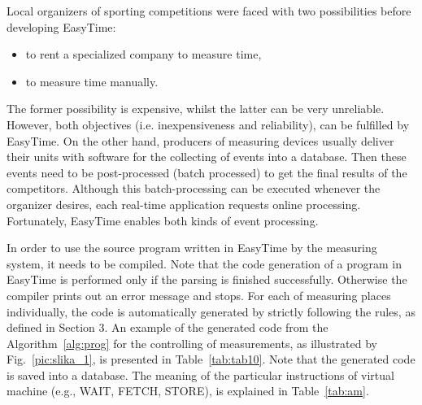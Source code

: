 \documentclass[preprint, prX]{revtex4}
\begin{document}
Local organizers of sporting competitions were faced with two possibilities before developing EasyTime:
\begin{itemize}
  \item to rent a specialized company to measure time,
  \item to measure time manually.
\end{itemize}
The former possibility is expensive, whilst the latter can be very unreliable. However, both objectives (i.e. inexpensiveness and reliability), can be fulfilled by EasyTime. On the other hand, producers of measuring devices usually deliver their units with software for the collecting of events into a database. Then these events need to be post-processed (batch processed) to get the final results of the competitors. Although this batch-processing can be executed whenever the organizer desires, each real-time application requests online processing. Fortunately, EasyTime enables both kinds of event processing.

In order to use the source program written in EasyTime by the measuring system, it needs to be compiled. Note that the code
generation \cite{Aho:1972} of a program in EasyTime is performed only if the parsing is finished successfully. Otherwise the compiler
prints out an error message and stops. For each of measuring places individually, the code is automatically generated by strictly following the rules, as defined in Section 3. An example of the generated code from the Algorithm~\ref{alg:prog} for the controlling of measurements, as illustrated by Fig.~\ref{pic:slika_1}, is presented in Table~\ref{tab:tab10}. Note that the generated code is saved
into a database. The meaning of the particular instructions of virtual machine (e.g., WAIT, FETCH, STORE), is explained in Table~\ref{tab:am}.
\end{document}
